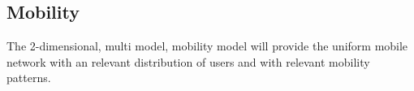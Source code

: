 \subsection{Mobility}
The 2-dimensional, multi model, mobility model \cite{bettstetter2001smooth} will provide the uniform mobile network with an relevant distribution of users and with relevant mobility patterns.